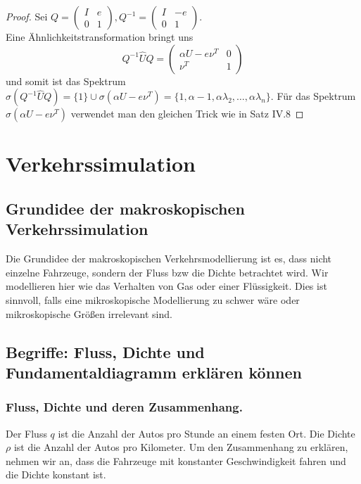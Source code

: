\documentclass[]{article}
\begin{document}
\begin{proof}
	Sei $Q = \begin{pmatrix} I & e \\ 0 & 1 \end{pmatrix}, Q^{-1} = \begin{pmatrix} I & -e \\ 0 & 1 \end{pmatrix}$. \\
	Eine Ähnlichkeitstransformation bringt uns
	\begin{equation*}
		Q^{-1} \hat{U} Q =
		\begin{pmatrix} 
		\alpha U - e \nu^T & 0 \\
		\nu^T & 1 
		\end{pmatrix}
	\end{equation*}
	und somit ist das  Spektrum $\sigma(Q^{-1} \hat{U} Q) = \{1\} \cup \sigma (\alpha U - e\nu^T) = \{ 1, \alpha-1, \alpha\lambda_2, \dotsc, \alpha \lambda_n\}$.
	Für das Spektrum $\sigma (\alpha U - e\nu^T)$ verwendet man den gleichen Trick wie in Satz IV.8
\end{proof}

\section{Verkehrssimulation}

\subsection*{Grundidee der makroskopischen Verkehrssimulation}
Die Grundidee der makroskopischen Verkehrsmodellierung ist es, dass nicht einzelne Fahrzeuge, sondern der Fluss bzw die Dichte betrachtet wird. Wir modellieren hier wie das Verhalten von Gas oder einer Flüssigkeit. Dies ist sinnvoll, falls eine mikroskopische Modellierung zu schwer wäre oder mikroskopische Größen irrelevant sind. 

\subsection*{Begriffe: Fluss, Dichte und Fundamentaldiagramm erklären können}

\subsubsection*{Fluss, Dichte und deren Zusammenhang. }
Der Fluss $q$ ist die Anzahl der Autos pro Stunde an einem festen Ort. 
Die Dichte  $\rho$ ist die Anzahl der Autos pro Kilometer. 
Um den Zusammenhang zu erklären, nehmen wir an, dass die Fahrzeuge mit konstanter Geschwindigkeit fahren und die Dichte konstant ist. 
\end{document}
